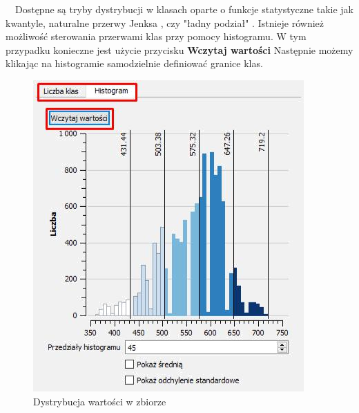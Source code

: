\documentclass[12pt,a4paper]{book}
\begin{document}
\ \ Dostępne są tryby dystrybucji w klasach oparte o funkcje statystyczne takie jak kwantyle, naturalne przerwy Jenksa \cite{Jenks}, czy "ładny podział" \cite{pretty}. Istnieje również możliwość sterowania przerwami klas przy pomocy histogramu. W tym przypadku konieczne jest użycie przycisku \textbf{Wczytaj wartości} Następnie możemy klikając na histogramie samodzielnie definiować granice klas.
\begin{figure}
	\centering
	\includegraphics[scale=0.4]{007-histogram.png}
	\caption{Dystrybucja wartości w zbiorze}
\end{figure}
\end{document}
